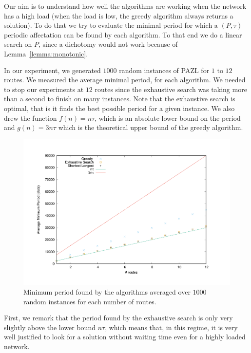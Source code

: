 \documentclass[a4paper,10pt]{article}
\begin{document}
      
      Our aim is to understand how well the algorithms are working when the network has a high load (when 
      the load is low, the greedy algorithm always returns a solution). To do that we try to evaluate the 
      minimal period for which a $(P,\tau)$ periodic affectation can be found by each algorithm. 
      To that end we do a linear search on $P$, since a dichotomy would not work because of Lemma~\ref{lemma:monotonic}.
      
      
      In our experiment, we generated $1000$ random instances of PAZL for $1$ to $12$ routes. 
      We measured the average minimal period, for each algorithm. We needed to stop our experiments at $12$ routes since the exhaustive search was taking more than a second to finish on many instances.
      Note that the exhaustive search is optimal, that is it finds the best possible period for a given instance. 
      We also drew the function $f(n) = n\tau$, which is an absolute lower bound on the period and $g(n) = 3n\tau$ which is the theoretical upper bound of the greedy algorithm.
      
      
        
        \begin{figure}

      \begin{center}
      \includegraphics[scale=0.4]{periode_petite.pdf}
      \end{center}
     \caption{Minimum period found by the algorithms averaged over $1000$ random instances for each number of routes.}
\end{figure}
      
      First, we remark that the period found by the exhaustive search is only very slightly above the lower bound 
      $n\tau$, which means that, in this regime, it is very well justified to look for a solution without waiting time even for a highly loaded network. 
      
\end{document}
